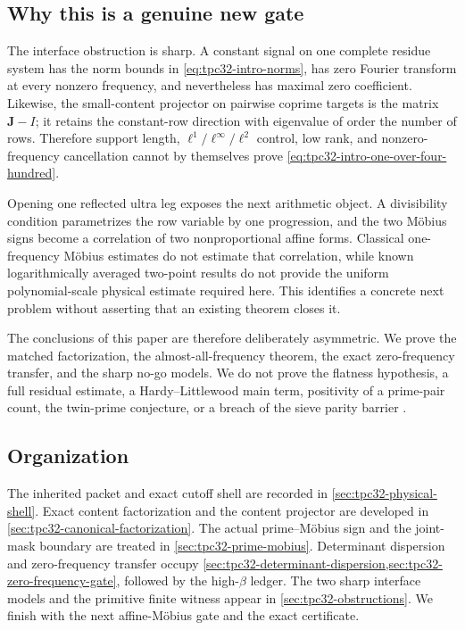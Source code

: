 \subsection{Why this is a genuine new gate}

The interface obstruction is sharp.  A constant signal on one complete
residue system has the norm bounds in \eqref{eq:tpc32-intro-norms}, has
zero Fourier transform at every nonzero frequency, and nevertheless has
maximal zero coefficient.  Likewise, the small-content projector on
pairwise coprime targets is the matrix $\mathbf J-I$; it retains the
constant-row direction with eigenvalue of order the number of rows.
Therefore support length, $\ell^1/\ell^\infty/\ell^2$ control, low rank,
and nonzero-frequency cancellation cannot by themselves prove
\eqref{eq:tpc32-intro-one-over-four-hundred}.

Opening one reflected ultra leg exposes the next arithmetic object.  A
divisibility condition parametrizes the row variable by one progression,
and the two M\"obius signs become a correlation of two nonproportional
affine forms.  Classical one-frequency M\"obius estimates do not estimate
that correlation, while known logarithmically averaged two-point results
do not provide the uniform polynomial-scale physical estimate required
here.  This identifies a concrete next problem without asserting that an
existing theorem closes it.

The conclusions of this paper are therefore deliberately asymmetric.  We
prove the matched factorization, the almost-all-frequency theorem, the
exact zero-frequency transfer, and the sharp no-go models.  We do not prove
the flatness hypothesis, a full residual estimate, a Hardy--Littlewood
main term, positivity of a prime-pair count, the twin-prime conjecture, or
a breach of the sieve parity barrier \citep{HeathBrown1982Parity}.

\subsection{Organization}

The inherited packet and exact cutoff shell are recorded in
\cref{sec:tpc32-physical-shell}.  Exact content factorization and the
content projector are developed in \cref{sec:tpc32-canonical-factorization}.
The actual prime--M\"obius sign and the joint-mask boundary are treated in
\cref{sec:tpc32-prime-mobius}.  Determinant dispersion and zero-frequency
transfer occupy
\cref{sec:tpc32-determinant-dispersion,sec:tpc32-zero-frequency-gate},
followed
by the high-$\beta$ ledger.  The two sharp interface models and the
primitive finite witness appear in \cref{sec:tpc32-obstructions}.
We finish with the next affine-M\"obius gate and the exact certificate.
